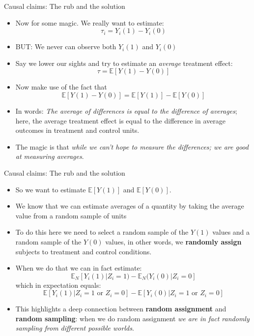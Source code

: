 \documentclass[
  11pt,
  ignorenonframetext,
]{beamer}
\providecommand{\tightlist}{%
  \setlength{\itemsep}{0pt}\setlength{\parskip}{0pt}}\usepackage{longtable,booktabs,array}
\begin{document}
\begin{frame}{Causal claims: The rub and the solution}
\protect\hypertarget{causal-claims-the-rub-and-the-solution}{}
\begin{itemize}
\item
  Now for some magic. We really want to estimate:
  \[ \tau_i = Y_i(1) - Y_i(0)\]
\item
  BUT: We never can observe both \(Y_i(1)\) and \(Y_i(0)\)
\item
  Say we lower our sights and try to estimate an \emph{average}
  treatment effect: \[ \tau = \mathbb{E} [Y(1)-Y(0)]\]
\item
  Now make use of the fact that
  \[\mathbb E[Y(1)-Y(0)]  = \mathbb E[Y(1)]- \mathbb E [Y(0)] \]
\item
  In words: \emph{The average of differences is equal to the difference
  of averages}; here, the average treatment effect is equal to the
  difference in average outcomes in treatment and control units.
\item
  The magic is that \emph{while we can't hope to measure the
  differences; we are good at measuring averages}.
\end{itemize}
\end{frame}

\begin{frame}{Causal claims: The rub and the solution}
\protect\hypertarget{causal-claims-the-rub-and-the-solution-1}{}
\begin{itemize}
\tightlist
\item
  So we want to estimate \(\mathbb{E} [Y(1)]\) and
  \(\mathbb{E} [Y(0)]\).
\item
  We know that we can estimate averages of a quantity by taking the
  average value from a random sample of units
\item
  To do this here we need to select a random sample of the \(Y(1)\)
  values and a random sample of the \(Y(0)\) values, in other words, we
  \textbf{randomly assign} subjects to treatment and control conditions.
\item
  When we do that we can in fact estimate:
  \[ \mathbb {E}_N[Y_i(1) | Z_i = 1) - \mathbb {E}_N(Y_i(0) | Z_i = 0]\]
  which in expectation equals:
  \[ \mathbb{E} [Y_i(1) | Z_i = 1 \text{ or } Z_i = 0] - \mathbb{E} [Y_i(0) | Z_i = 1 \text{ or } Z_i = 0]\]
\item
  This highlights a deep connection between \textbf{random assignment}
  and \textbf{random sampling}: when we do random assignment \emph{we
  are in fact randomly sampling from different possible worlds}.
\end{itemize}
\end{frame}
\end{document}
